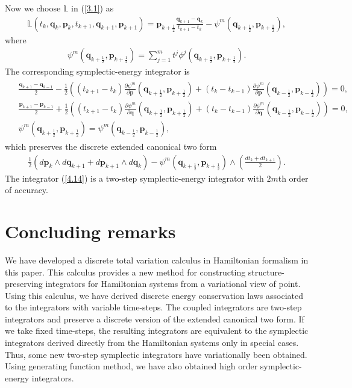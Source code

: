 \documentclass[a4paper,a4paper]{article}
\def\sect#1{\section{#1}\setcounter{equation}{0}}
\def\q{\boldsymbol{q}}
\def\p{\boldsymbol{p}}
\begin{document}
Now we choose $\mathbb{L}$ in (\ref{3.1}) as
\begin{align}
  \mathbb{L}(t_{k}, \q_{k}, \p_{k}, t_{k+1}, \q_{k+1}, \p_{k+1})
     =\p_{k+\frac{1}{2}}\frac{\q_{k+1}-\q_{k}}{t_{k+1}-t_{k}}-\psi^{m}(\q_{k+\frac{1}{2}},
     \p_{k+\frac{1}{2}}), \label{4.12}
\end{align}
where
\begin{align}
 \psi^{m}(\q_{k+\frac{1}{2}}, \p_{k+\frac{1}{2}})
  =\sum_{j=1}^{m}t^{j}\phi^{j}(\q_{k+\frac{1}{2}}, \p_{k+\frac{1}{2}}).
\label{4.13}
\end{align}
The corresponding symplectic-energy integrator is
\small
\begin{align}
\begin{split}
   &\frac{\q_{k+1}-\q_{k-1}}{2}-\frac{1}{2}\left((t_{k+1}-t_{k})\frac{\partial \psi^{m}}
    {\partial \p}(\q_{k+\frac{1}{2}},
    \p_{k+\frac{1}{2}})+(t_{k}-t_{k-1})\frac{\partial \psi^{m}}{\partial \p}(\q_{k-\frac{1}{2}},
    \p_{k-\frac{1}{2}})\right)=0,\\
  &\frac{\p_{k+1}-\p_{k-1}}{2}+\frac{1}{2}\left((t_{k+1}-t_{k})\frac{\partial \psi^{m}}{\partial \q}
    (\q_{k+\frac{1}{2}},
    \p_{k+\frac{1}{2}})+(t_{k}-t_{k-1})\frac{\partial \psi^{m}}{\partial \q}(\q_{k-\frac{1}{2}},
    \p_{k-\frac{1}{2}})\right)=0,
   \\
   &\psi^{m}(\q_{k+\frac{1}{2}}, \p_{k+\frac{1}{2}})=
     \psi^{m}(\q_{k-\frac{1}{2}}, \p_{k-\frac{1}{2}}),
\end{split}\label{4.14}
\end{align}
\normalsize which preserves the discrete extended canonical two
form
\begin{align}
\frac{1}{2}(d\p_{k}\wedge d\q_{k+1}+d\p_{k+1}\wedge d\q_{k})
  -\psi^{m}(\q_{k+\frac{1}{2}}, \p_{k+\frac{1}{2}})\wedge
   \left(\frac{dt_{k}+dt_{k+1}}{2}\right). \label{4.15}
\end{align}
The integrator (\ref{4.14}) is a two-step symplectic-energy
integrator with $2m$th order of accuracy.



\sect{Concluding remarks}

We have developed a discrete total variation calculus in
Hamiltonian formalism in this paper. This calculus provides a new
method for constructing structure-preserving integrators for
Hamiltonian systems from a variational view of point. Using this
calculus, we have  derived discrete energy conservation laws
associated to the integrators with variable time-steps. The coupled
integrators are two-step integrators and preserve a discrete
version of the extended canonical two form. If we take fixed
time-steps, the resulting integrators are equivalent to the
symplectic integrators derived directly from the Hamiltonian
systems only in special cases. Thus, some new two-step symplectic
integrators have variationally been obtained. Using generating
function method, we have also obtained high order
symplectic-energy integrators.
\end{document}
